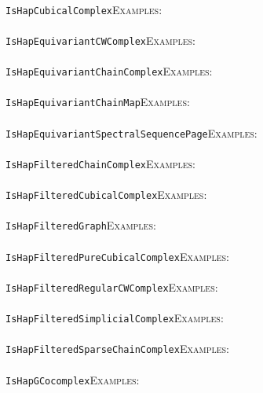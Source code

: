 \documentclass[a4paper,11pt]{report}
\begin{document}
{{ \\
 \texttt{IsHapCubicalComplex}{\nobreakspace}{\nobreakspace}{\nobreakspace}{\nobreakspace}\textsc{Examples:} \\
 \\
 \texttt{IsHapEquivariantCWComplex}{\nobreakspace}{\nobreakspace}{\nobreakspace}{\nobreakspace}\textsc{Examples:} \\
 \\
 \texttt{IsHapEquivariantChainComplex}{\nobreakspace}{\nobreakspace}{\nobreakspace}{\nobreakspace}\textsc{Examples:} \\
 \\
 \texttt{IsHapEquivariantChainMap}{\nobreakspace}{\nobreakspace}{\nobreakspace}{\nobreakspace}\textsc{Examples:} \\
 \\
 \texttt{IsHapEquivariantSpectralSequencePage}{\nobreakspace}{\nobreakspace}{\nobreakspace}{\nobreakspace}\textsc{Examples:} \\
 \\
 \texttt{IsHapFilteredChainComplex}{\nobreakspace}{\nobreakspace}{\nobreakspace}{\nobreakspace}\textsc{Examples:} \\
 \\
 \texttt{IsHapFilteredCubicalComplex}{\nobreakspace}{\nobreakspace}{\nobreakspace}{\nobreakspace}\textsc{Examples:} \\
 \\
 \texttt{IsHapFilteredGraph}{\nobreakspace}{\nobreakspace}{\nobreakspace}{\nobreakspace}\textsc{Examples:} \\
 \\
 \texttt{IsHapFilteredPureCubicalComplex}{\nobreakspace}{\nobreakspace}{\nobreakspace}{\nobreakspace}\textsc{Examples:} \\
 \\
 \texttt{IsHapFilteredRegularCWComplex}{\nobreakspace}{\nobreakspace}{\nobreakspace}{\nobreakspace}\textsc{Examples:} \\
 \\
 \texttt{IsHapFilteredSimplicialComplex}{\nobreakspace}{\nobreakspace}{\nobreakspace}{\nobreakspace}\textsc{Examples:} \\
 \\
 \texttt{IsHapFilteredSparseChainComplex}{\nobreakspace}{\nobreakspace}{\nobreakspace}{\nobreakspace}\textsc{Examples:} \\
 \\
 \texttt{IsHapGCocomplex}{\nobreakspace}{\nobreakspace}{\nobreakspace}{\nobreakspace}\textsc{Examples:} \\
}}
\end{document}
